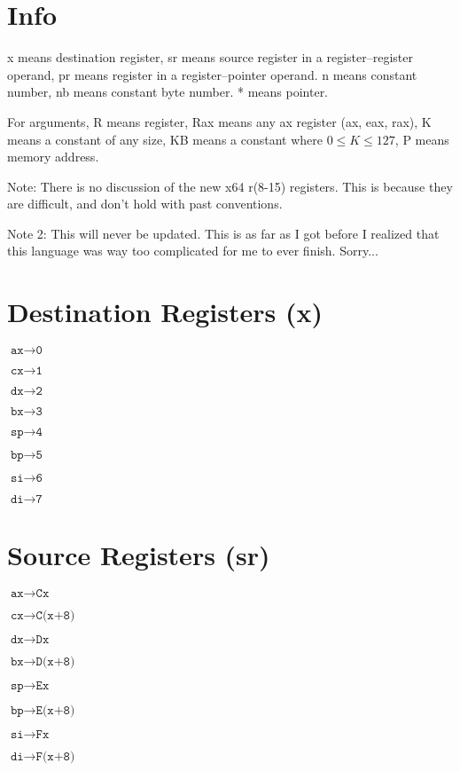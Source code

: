 \documentclass{article}
\begin{document}
\section*{Info}

x means destination register, sr means source register in a register--register
operand, pr means register in a register--pointer operand. n means constant
number, nb means constant byte number. * means pointer.

For arguments, R means register, Rax means any ax register (ax, eax, rax),
K means a constant of any size, KB means a constant where $0 \leq K \leq 127$,
P means memory address.

Note: There is no discussion of the new x64 r(8-15) registers. This is because
they are difficult, and don't hold with past conventions.

Note 2: This will never be updated. This is as far as I got before I realized
that this language was way too complicated for me to ever finish. Sorry...

\section*{Destination Registers (x)}
\begin{minipage}{\textwidth}

$\texttt{ax} \rightarrow \texttt{0}$

$\texttt{cx} \rightarrow \texttt{1}$

$\texttt{dx} \rightarrow \texttt{2}$

$\texttt{bx} \rightarrow \texttt{3}$

$\texttt{sp} \rightarrow \texttt{4}$

$\texttt{bp} \rightarrow \texttt{5}$

$\texttt{si} \rightarrow \texttt{6}$

$\texttt{di} \rightarrow \texttt{7}$

\end{minipage}


\section*{Source Registers (sr)}
\begin{minipage}{\textwidth}

$\texttt{ax} \rightarrow \texttt{Cx}$

$\texttt{cx} \rightarrow \texttt{C(x+8)}$

$\texttt{dx} \rightarrow \texttt{Dx}$

$\texttt{bx} \rightarrow \texttt{D(x+8)}$

$\texttt{sp} \rightarrow \texttt{Ex}$

$\texttt{bp} \rightarrow \texttt{E(x+8)}$

$\texttt{si} \rightarrow \texttt{Fx}$

$\texttt{di} \rightarrow \texttt{F(x+8)}$

\end{minipage}
\end{document}
